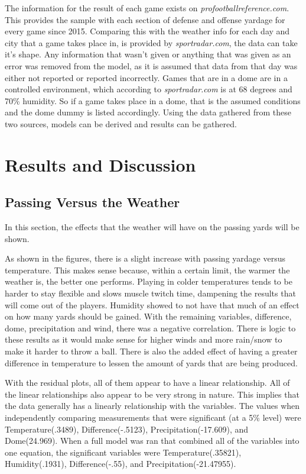 \documentclass[12pt]{article}
\begin{document}
\quad The information for the result of each game exists on \textit{profootballreference.com}. This provides the sample with each section of defense and offense yardage for every game since 2015. Comparing this with the weather info for each day and city that a game takes place in, is provided by \textit{sportradar.com}, the data can take it's shape. Any information that wasn't given or anything that was given as an error was removed from the model, as it is assumed that data from that day was either not reported or reported incorrectly. Games that are in a dome are in a controlled environment, which according to \textit{sportradar.com} is at 68 degrees and 70\% humidity. So if a game takes place in a dome, that is the assumed conditions and the dome dummy is listed accordingly. Using the data gathered from these two sources, models can be derived and results can be gathered. 

\section{Results and Discussion}\label{result}

\subsection{Passing Versus the Weather}
In this section, the effects that the weather will have on the passing yards will be shown.

As shown in the figures, there is a slight increase with passing yardage versus temperature. This makes sense because, within a certain limit, the warmer the weather is, the better one performs. Playing in colder temperatures tends to be harder to stay flexible and slows muscle twitch time, dampening the results that will come out of the players. Humidity showed to not have that much of an effect on how many yards should be gained. With the remaining variables, difference, dome, precipitation and wind, there was a negative correlation. There is logic to these results as it would make sense for higher winds and more rain/snow to make it harder to throw a ball. There is also the added effect of having a greater difference in temperature to lessen the amount of yards that are being produced.

With the residual plots, all of them appear to have a linear relationship. All of the linear relationships also appear to be very strong in nature. This implies that the data generally has a linearly relationship with the variables. The values when independently comparing measurements that were significant (at a 5\% level) were Temperature(.3489), Difference(-.5123), Precipitation(-17.609), and Dome(24.969). When a full model was ran that combined all of the variables into one equation, the significant variables were Temperature(.35821), Humidity(.1931), Difference(-.55), and Precipitation(-21.47955).
\end{document}
